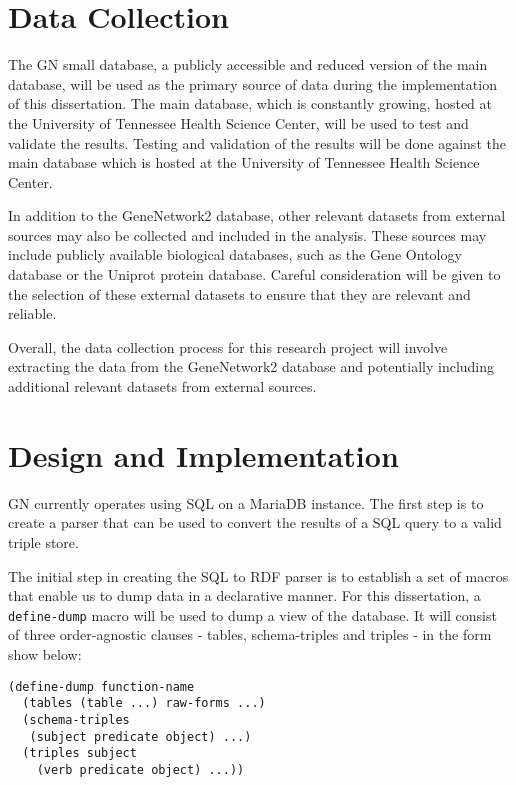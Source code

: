 \section{Data Collection}

The GN small database, a publicly accessible and reduced version of the main database, will be used as the primary source of data during the implementation of this dissertation.  The main database, which is constantly growing, hosted at the University of Tennessee Health Science Center, will be used to test and validate the results.  Testing and validation of the results will be done against the main database which is hosted at the University of Tennessee Health Science Center.

In addition to the GeneNetwork2 database, other relevant datasets from external sources may also be collected and included in the analysis.  These sources may include publicly available biological databases, such as the Gene Ontology database or the Uniprot protein database.  Careful consideration will be given to the selection of these external datasets to ensure that they are relevant and reliable.

Overall, the data collection process for this research project will involve extracting the data from the GeneNetwork2 database and potentially including additional relevant datasets from external sources.

\section{Design and Implementation}

GN currently operates using SQL on a MariaDB instance.  The first step is to create a parser that can be used to convert the results of a SQL query to a valid triple store.

The initial step in creating the SQL to RDF parser is to establish a set of macros that enable us to dump data in a declarative manner.  For this dissertation, a \texttt{define-dump} macro will be used to dump a view of the database.  It will consist of three order-agnostic clauses - tables, schema-triples and triples - in the form show below:

\begin{verbatim}
(define-dump function-name
  (tables (table ...) raw-forms ...)
  (schema-triples
   (subject predicate object) ...)
  (triples subject
    (verb predicate object) ...))
\end{verbatim}

